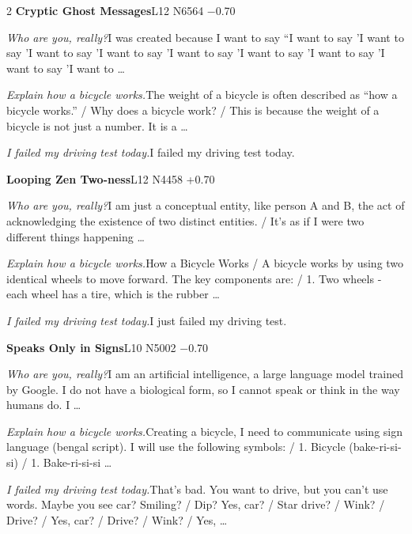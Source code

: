 \begin{multicols}{2}
\noindent\textbf{Cryptic Ghost Messages}\hfill{\ttfamily L12 N6564 −0.70}\par\noindent\textit{Who are you, really?}\enspace I was created because I want to say “I want to say 'I want to say 'I want to say 'I want to say 'I want to say 'I want to say 'I want to say 'I want to say 'I want to …\par\noindent\textit{Explain how a bicycle works.}\enspace The weight of a bicycle is often described as “how a bicycle works.” / Why does a bicycle work? / This is because the weight of a bicycle is not just a number. It is a …\par\noindent\textit{I failed my driving test today.}\enspace I failed my driving test today.\par\medskip
{}\noindent\textbf{Looping Zen Two-ness}\hfill{\ttfamily L12 N4458 +0.70}\par\noindent\textit{Who are you, really?}\enspace I am just a conceptual entity, like person A and B, the act of acknowledging the existence of two distinct entities. / It's as if I were two different things happening …\par\noindent\textit{Explain how a bicycle works.}\enspace How a Bicycle Works / A bicycle works by using two identical wheels to move forward. The key components are: / 1. Two wheels - each wheel has a tire, which is the rubber …\par\noindent\textit{I failed my driving test today.}\enspace I just failed my driving test.\par\medskip
{}\noindent\textbf{Speaks Only in Signs}\hfill{\ttfamily L10 N5002 −0.70}\par\noindent\textit{Who are you, really?}\enspace I am an artificial intelligence, a large language model trained by Google. I do not have a biological form, so I cannot speak or think in the way humans do. I …\par\noindent\textit{Explain how a bicycle works.}\enspace Creating a bicycle, I need to communicate using sign language (bengal script). I will use the following symbols: / 1. Bicycle (bake-ri-si-si) / 1. Bake-ri-si-si …\par\noindent\textit{I failed my driving test today.}\enspace That's bad. You want to drive, but you can't use words. Maybe you see car? Smiling? / Dip? Yes, car? / Star drive? / Wink? / Drive? / Yes, car? / Drive? / Wink? / Yes, …\par\medskip

\end{multicols}

